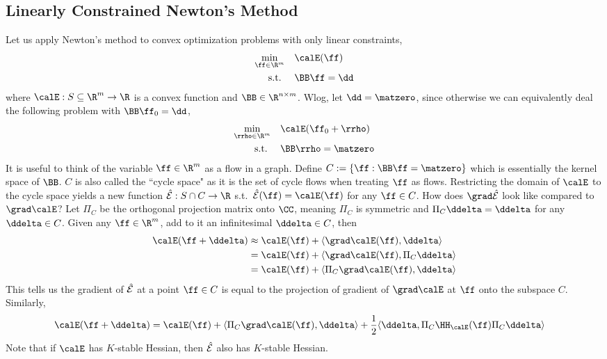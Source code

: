 \subsection{Linearly Constrained Newton's Method}
Let us apply Newton's method to convex optimization problems with only linear constraints,
\begin{align*}
  \min_{\ff\in\R^m}\quad & \calE(\ff) \\
  \st\quad  & \BB\ff = \dd
\end{align*}
where $\calE:S\subseteq\R^m\to\R$ is a convex function and $\BB\in\R^{n\times m}$. Wlog, let $\dd=\matzero$, since otherwise we can equivalently deal the following problem with $\BB\ff_0 = \dd$,
\begin{align*}
  \min_{\rrho\in\R^m}\quad & \calE(\ff_0+\rrho) \\
  \st\quad  & \BB\rrho = \matzero
\end{align*}
It is useful to think of the variable $\ff\in\R^m$ as a flow in a graph.
Define $C := \{\ff:\BB\ff=\matzero\}$ which is essentially the kernel space of $\BB$. $C$ is also called the ``cycle space" as it is the set of cycle flows when treating $\ff$ as flows.
Restricting the domain of $\calE$ to the cycle space yields a new function $\hcalE: S \cap C \to \R$ s.t.\ $\hcalE(\ff) = \calE(\ff)$ for any $\ff\in C$.
How does $\grad\hcalE$ look like compared to $\grad\calE$?
Let $\Pi_C$ be the orthogonal projection matrix onto $\CC$, meaning $\Pi_C$ is symmetric and $\Pi_C\ddelta=\ddelta$ for any $\ddelta\in C$.
Given any $\ff\in\R^m$, add to it an infinitesimal $\ddelta\in C$, then
\begin{align*}
  \calE(\ff+\ddelta) &\approx \calE(\ff) + \langle\grad\calE(\ff),\ddelta\rangle \\
  &= \calE(\ff) + \langle\grad\calE(\ff),\Pi_C\ddelta\rangle \\
  &= \calE(\ff) + \langle\Pi_C\grad\calE(\ff),\ddelta\rangle
\end{align*}
This tells us the gradient of $\hat{\mathcal{E}}$ at a point $\ff\in C$ is equal to the projection of gradient of $\grad\calE$ at $\ff$ onto the subspace $C$.
Similarly,
\begin{align*}
  \calE(\ff+\ddelta) &= \calE(\ff) + \langle\Pi_C\grad\calE(\ff),\ddelta\rangle + \frac{1}{2}\langle\ddelta,\Pi_C\HH_{\calE}(\ff)\Pi_C\ddelta\rangle
\end{align*}
Note that if $\calE$ has $K$-stable Hessian, then $\hat{\mathcal{E}}$ also has $K$-stable Hessian.

